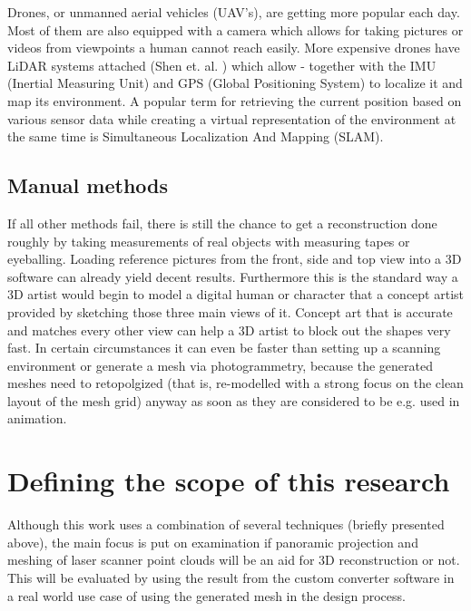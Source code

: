 Drones, or unmanned aerial vehicles (UAV's), are getting more popular each day. Most of them are also equipped with a camera which allows for taking pictures or videos from viewpoints a human cannot reach easily. More expensive drones have LiDAR systems attached (Shen et. al. \parencite{drones_lidar}) which allow - together with the IMU (Inertial Measuring Unit) and GPS (Global Positioning System) to localize it and map its environment. A popular term for retrieving the current position based on various sensor data while creating a virtual representation of the environment at the same time is Simultaneous Localization And Mapping (SLAM).

\subsection{Manual methods}

If all other methods fail, there is still the chance to get a reconstruction done roughly by taking measurements of real objects with measuring tapes or eyeballing. Loading reference pictures from the front, side and top view into a 3D software can already yield decent results. Furthermore this is the standard way a 3D artist would begin to model a digital human or character that a concept artist provided by sketching those three main views of it. Concept art that is accurate and matches every other view can help a 3D artist to block out the shapes very fast. In certain circumstances it can even be faster than setting up a scanning environment or generate a mesh via photogrammetry, because the generated meshes need to retopolgized (that is, re-modelled with a strong focus on the clean layout of the mesh grid) anyway as soon as they are considered to be e.g. used in animation.

\section{Defining the scope of this research}

Although this work uses a combination of several techniques (briefly presented above), the main focus is put on examination if panoramic projection and meshing of laser scanner point clouds will be an aid for 3D reconstruction or not. This will be evaluated by using the result from the custom converter software in a real world use case of using the generated mesh in the design process.